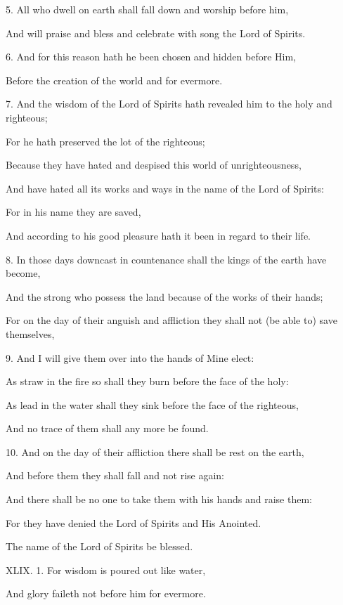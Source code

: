 5. All who dwell on earth shall fall down and worship before him,

And will praise and bless and celebrate with song the Lord of Spirits.

6. And for this reason hath he been chosen and hidden before Him,

Before the creation of the world and for evermore.

7. And the wisdom of the Lord of Spirits hath revealed him to the holy and righteous;

For he hath preserved the lot of the righteous;

Because they have hated and despised this world of unrighteousness,

And have hated all its works and ways in the name of the Lord of Spirits:

For in his name they are saved,

And according to his good pleasure hath it been in regard to their life.

8. In those days downcast in countenance shall the kings of the earth have become,

And the strong who possess the land because of the works of their hands;

For on the day of their anguish and affliction they shall not (be able to) save themselves,

9. And I will give them over into the hands of Mine elect:

As straw in the fire so shall they burn before the face of the holy:

As lead in the water shall they sink before the face of the righteous,

And no trace of them shall any more be found.

10. And on the day of their affliction there shall be rest on the earth,

And before them they shall fall and not rise again:

And there shall be no one to take them with his hands and raise them:

For they have denied the Lord of Spirits and His Anointed.

The name of the Lord of Spirits be blessed.


XLIX. 1. For wisdom is poured out like water,

And glory faileth not before him for evermore.

